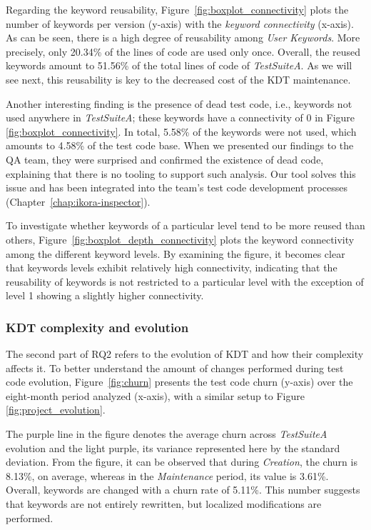 Regarding the keyword reusability, Figure~\ref{fig:boxplot_connectivity} plots the number of keywords per version (y-axis) with the \emph{keyword connectivity} (x-axis). As can be seen, there is a high degree of reusability among \emph{User Keywords}. More precisely, only 20.34\% of the lines of code are used only once. Overall, the reused keywords amount to 51.56\% of the total lines of code of \emph{TestSuiteA}. As we will see next, this reusability is key to the decreased cost of the KDT maintenance.

Another interesting finding is the presence of dead test code, i.e., keywords not used anywhere in \emph{TestSuiteA}; these keywords have a connectivity of 0 in Figure \ref{fig:boxplot_connectivity}. In total, 5.58\% of the keywords were not used, which amounts to 4.58\% of the test code base. When we presented our findings to the QA team, they were surprised and confirmed the existence of dead code, explaining that there is no tooling to support such analysis. Our tool solves this issue and has been integrated into the team's test code development processes (Chapter~\ref{chap:ikora-inspector}).

To investigate whether keywords of a particular level tend to be more reused than others, Figure~\ref{fig:boxplot_depth_connectivity} plots the keyword connectivity among the different keyword levels. By examining the figure, it becomes clear that keywords levels exhibit relatively high connectivity, indicating that the reusability of keywords is not restricted to a particular level with the exception of level 1 showing a slightly higher connectivity.



\subsubsection{KDT complexity and evolution}
\label{sec:kdt-complexity-evolution}

The second part of RQ2 refers to the evolution of KDT and how their complexity affects it. To better understand the amount of changes performed during test code evolution, Figure~\ref{fig:churn} presents the test code churn (y-axis) over the eight-month period analyzed (x-axis), with a similar setup to Figure \ref{fig:project_evolution}.

The purple line in the figure denotes the average churn across \emph{TestSuiteA} evolution and the light purple, its variance represented here by the standard deviation. From the figure, it can be observed that during \emph{Creation}, the churn is 8.13\%, on average, whereas in the \emph{Maintenance} period, its value is 3.61\%. Overall, keywords are changed with a churn rate of 5.11\%. This number suggests that keywords are not entirely rewritten, but localized modifications are performed.

